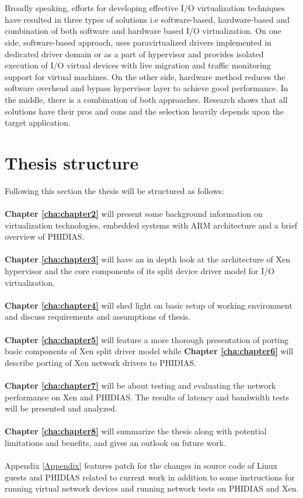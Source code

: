 \\
\\
Broadly speaking, efforts for developing effective I/O virtualization techniques have resulted in three types of solutions i.e software-based, hardware-based and combination of both software and hardware based I/O virtualization. On one side, software-based approach, uses paravirtualized drivers implemented in dedicated driver domain or as a part of hypervisor and provides isolated execution of I/O virtual devices with live migration \cite{migration} and traffic monitoring \cite{monitoring} support for virtual machines. On the other side, hardware method reduces the software overhead and bypass hypervisor layer to achieve good performance. In the middle, there is a combination of both approaches. Research shows that all solutions have their pros and cons and the selection heavily depends upon the target application.

\section{Thesis structure \label{sec:outline}}

Following this section the thesis will be structured as follows:
\\
\\
\textbf{Chapter \ref{cha:chapter2}} will present some background information on virtualization technologies, embedded systems with ARM architecture and a brief overview of PHIDIAS.
\\
\\
\textbf{Chapter \ref{cha:chapter3}} will have an in depth look at the architecture of Xen hypervisor and the core components of its split device driver model for I/O virtualization.
\\
\\
\textbf{Chapter \ref{cha:chapter4}} will shed light on basic setup of working environment and discuss requirements and assumptions of thesis.
\\
\\
\textbf{Chapter \ref{cha:chapter5}} will feature a more thorough presentation of porting basic components of Xen split driver model while \textbf{Chapter \ref{cha:chapter6}} will describe porting of Xen network drivers to PHIDIAS.
\\
\\
\textbf{Chapter \ref{cha:chapter7}} will be about testing and evaluating the network performance on Xen and PHIDIAS. The results of latency and bandwidth tests will be presented and analyzed.
\\
\\
\textbf{Chapter \ref{cha:chapter8}} will summarize the thesis along with potential limitations and benefits, and gives an outlook on future work.
\\
\\
Appendix \ref{Appendix} features patch for the changes in source code of Linux guests and PHIDIAS related to current work in addition to some instructions for running virtual network devices and running network tests on PHIDIAS and Xen.